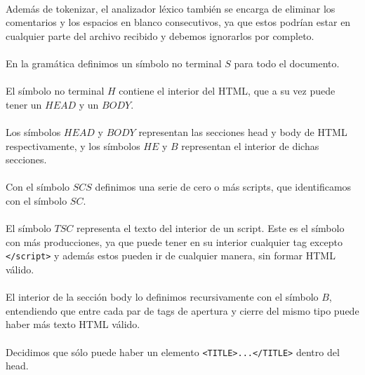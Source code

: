 \paragraph{} Además de tokenizar, el analizador léxico también se encarga de eliminar los comentarios y los espacios en blanco consecutivos, ya que estos podrían estar en cualquier parte del archivo recibido y debemos ignorarlos por completo.

\paragraph{} En la gramática definimos un símbolo no terminal $S$ para todo el documento.

\paragraph{} El símbolo no terminal $H$ contiene el interior del HTML, que a su vez puede tener un $HEAD$ y un $BODY$.

\paragraph{} Los símbolos $HEAD$ y $BODY$ representan las secciones head y body de HTML respectivamente, y los símbolos $HE$ y $B$ representan el interior de dichas secciones.

\paragraph{} Con el símbolo $SCS$ definimos una serie de cero o más scripts, que identificamos con el símbolo $SC$. 

\paragraph{} El símbolo $TSC$ representa el texto del interior de un script. Este es el símbolo con más producciones, ya que puede tener en su interior cualquier tag excepto \verb|</script>| y además estos pueden ir de cualquier manera, sin formar HTML válido.

\paragraph{} El interior de la sección body lo definimos recursivamente con el símbolo $B$, entendiendo que entre cada par de tags de apertura y cierre del mismo tipo puede haber más texto HTML válido.

\paragraph{} Decidimos que sólo puede haber un elemento \verb|<TITLE>...</TITLE>| dentro del head.

